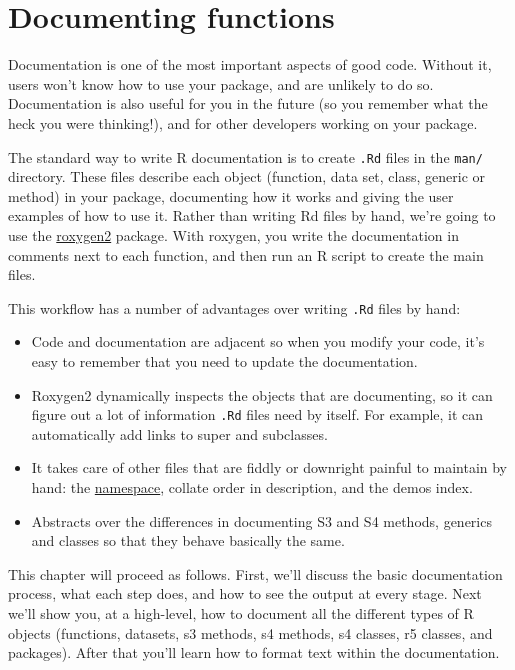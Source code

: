 \chapter{Documenting functions}

Documentation is one of the most important aspects of good code. Without
it, users won't know how to use your package, and are unlikely to do so.
Documentation is also useful for you in the future (so you remember what
the heck you were thinking!), and for other developers working on your
package.

The standard way to write R documentation is to create \texttt{.Rd}
files in the \texttt{man/} directory. These files describe each object
(function, data set, class, generic or method) in your package,
documenting how it works and giving the user examples of how to use it.
Rather than writing Rd files by hand, we're going to use the
\href{http://roxygen.org/}{roxygen2} package. With roxygen, you write
the documentation in comments next to each function, and then run an R
script to create the main files.

This workflow has a number of advantages over writing \texttt{.Rd} files
by hand:

\begin{itemize}
\item
  Code and documentation are adjacent so when you modify your code, it's
  easy to remember that you need to update the documentation.
\item
  Roxygen2 dynamically inspects the objects that are documenting, so it
  can figure out a lot of information \texttt{.Rd} files need by itself.
  For example, it can automatically add links to super and subclasses.
\item
  It takes care of other files that are fiddly or downright painful to
  maintain by hand: the \href{`NAMESPACE`}{namespace}, collate order in
  description, and the demos index.
\item
  Abstracts over the differences in documenting S3 and S4 methods,
  generics and classes so that they behave basically the same.
\end{itemize}

This chapter will proceed as follows. First, we'll discuss the basic
documentation process, what each step does, and how to see the output at
every stage. Next we'll show you, at a high-level, how to document all
the different types of R objects (functions, datasets, s3 methods, s4
methods, s4 classes, r5 classes, and packages). After that you'll learn
how to format text within the documentation.

